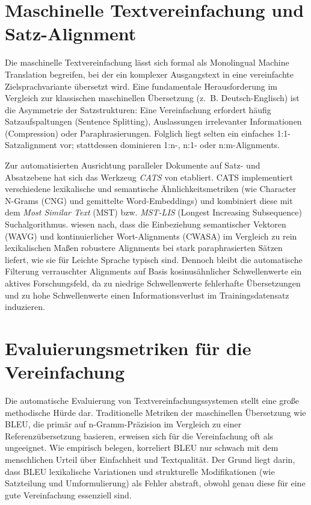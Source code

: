 \section{Maschinelle Textvereinfachung und Satz-Alignment}
\label{sec:maschinelle_textvereinfachung_alignment}

Die maschinelle Textvereinfachung lässt sich formal als Monolingual Machine Translation begreifen, bei der ein komplexer Ausgangstext in eine vereinfachte Zielsprachvariante übersetzt wird. Eine fundamentale Herausforderung im Vergleich zur klassischen maschinellen Übersetzung (z.~B. Deutsch-Englisch) ist die Asymmetrie der Satzstrukturen: Eine Vereinfachung erfordert häufig Satzaufspaltungen (Sentence Splitting), Auslassungen irrelevanter Informationen (Compression) oder Paraphrasierungen. Folglich liegt selten ein einfaches 1:1-Satzalignment vor; stattdessen dominieren 1:n-, n:1- oder n:m-Alignments.

Zur automatisierten Ausrichtung paralleler Dokumente auf Satz- und Absatzebene hat sich das Werkzeug \textit{CATS} von \citet{stajner2018cats} etabliert. CATS implementiert verschiedene lexikalische und semantische Ähnlichkeitsmetriken (wie Character N-Grams (CNG) und gemittelte Word-Embeddings) und kombiniert diese mit dem \textit{Most Similar Text} (MST) bzw. \textit{MST-LIS} (Longest Increasing Subsequence) Suchalgorithmus. \citet{stajner2018cats} wiesen nach, dass die Einbeziehung semantischer Vektoren (WAVG) und kontinuierlicher Wort-Alignments (CWASA) im Vergleich zu rein lexikalischen Maßen robustere Alignments bei stark paraphrasierten Sätzen liefert, wie sie für Leichte Sprache typisch sind. Dennoch bleibt die automatische Filterung verrauschter Alignments auf Basis kosinusähnlicher Schwellenwerte ein aktives Forschungsfeld, da zu niedrige Schwellenwerte fehlerhafte Übersetzungen und zu hohe Schwellenwerte einen Informationsverlust im Trainingsdatensatz induzieren.

\section{Evaluierungsmetriken für die Vereinfachung}
\label{sec:evaluierungsmetriken}

Die automatische Evaluierung von Textvereinfachungssystemen stellt eine große methodische Hürde dar. Traditionelle Metriken der maschinellen Übersetzung wie BLEU, die primär auf n-Gramm-Präzision im Vergleich zu einer Referenzübersetzung basieren, erweisen sich für die Vereinfachung oft als ungeeignet. Wie \citet{alva2021unsuitability} empirisch belegen, korreliert BLEU nur schwach mit dem menschlichen Urteil über Einfachheit und Textqualität. Der Grund liegt darin, dass BLEU lexikalische Variationen und strukturelle Modifikationen (wie Satzteilung und Umformulierung) als Fehler abstraft, obwohl genau diese für eine gute Vereinfachung essenziell sind.

